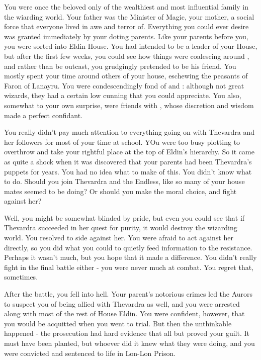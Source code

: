 \documentclass[char]{Katmeers}
\begin{document}
\name{\cLucius{}}


You were once the beloved only \cLucius{\offspring} of the wealthiest and most influential family in the wiarding world. Your father was the Minister of Magic, your mother, a social force that everyone lived in awe and terror of. Everything you could ever desire was granted immediately by your doting parents. Like your parents before you, you were sorted into Eldin House. You had intended to be a leader of your House, but after the first few weeks, you could see how things were coalescing around \cMalfoy{}, and rather than be outcast, you grudgingly pretended to be his friend. You mostly spent your time around others of your house, eschewing the peasants of Faron of Lanayru. You were condescendingly fond of \cGhost{\formal} and \cGoyle{\formal}: although not great wizards, they had a certain low cunning that you could appreciate. You also, somewhat to your own surprise, were friends with \cCrabbe{}, whose discretion and wisdom made \cCrabbe{\them} a perfect confidant.

You really didn't pay much attention to everything going on with Thevardra and her followers for most of your time at school. YOu were too busy plotting to overthrow \cMalfoy{\formal} and take your rightful place at the top of Eldin's hierarchy. So it came as quite a shock when it was discovered that your parents had been Thevardra's puppets for years. You had no idea what to make of this. You didn't know what to do. Should you join Thevardra and the Endless, like so many of your house mates seemed to be doing? Or should you make the moral choice, and fight against her?

Well, you might be somewhat blinded by pride, but even you could see that if Thevardra succeeded in her quest for purity, it would destroy the wizarding world. You resolved to side against her. You were afraid to act against her directly, so you did what you could to quietly feed information to the resistance. Perhaps it wasn't much, but you hope that it made a difference. You didn't really fight in the final battle either - you were never much at combat. You regret that, sometimes.

After the battle, you fell into hell. Your parent's notorious crimes led the Aurors to suspect you of being allied with Thevardra as well, and you were arrested along with most of the rest of House Eldin. You were confident, however, that you would be acquitted when you went to trial. But then the unthinkable happened - the prosecution had hard evidence that all but proved your guilt. It must have been planted, but whoever did it knew what they were doing, and you were convicted and sentenced to life in Lon-Lon Prison.
\end{document}
